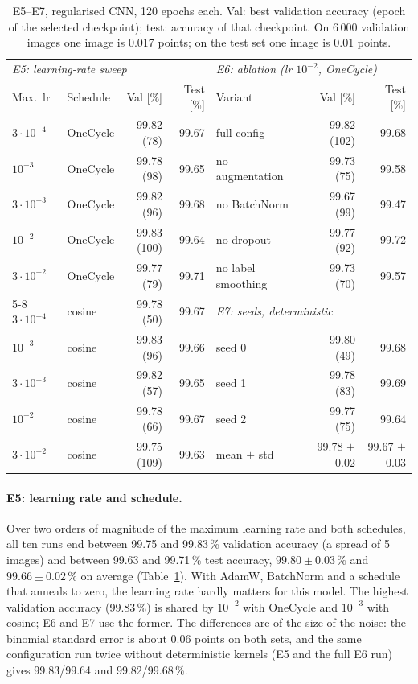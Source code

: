 \documentclass[11pt,a4paper]{article}
\newcommand{\1}{\mathbf{1}}
\begin{document}
\begin{table}[t]
  \centering
  \caption{E5--E7, regularised CNN, 120 epochs each. Val: best validation accuracy (epoch of
    the selected checkpoint); test: accuracy of that checkpoint. On 6\,000 validation images
    one image is 0.017 points; on the test set one image is 0.01 points.}
  \label{tab:cnn}
  \small
  \setlength{\tabcolsep}{4pt}
  \begin{tabular}{llrr@{\hspace{2em}}llrr}
    \toprule
    \multicolumn{4}{l}{\emph{E5: learning-rate sweep}} & \multicolumn{4}{l}{\emph{E6: ablation (lr $10^{-2}$, OneCycle)}} \\
    Max.\ lr & Schedule & Val [\%] & Test [\%] & Variant & & Val [\%] & Test [\%] \\
    \midrule
    $3 \cdot 10^{-4}$ & OneCycle & 99.82 (78) & 99.67 & full config & & 99.82 (102) & 99.68 \\
    $10^{-3}$ & OneCycle & 99.78 (98) & 99.65 & no augmentation & & 99.73 (75) & 99.58 \\
    $3 \cdot 10^{-3}$ & OneCycle & 99.82 (96) & 99.68 & no BatchNorm & & 99.67 (99) & 99.47 \\
    $10^{-2}$ & OneCycle & 99.83 (100) & 99.64 & no dropout & & 99.77 (92) & 99.72 \\
    $3 \cdot 10^{-2}$ & OneCycle & 99.77 (79) & 99.71 & no label smoothing & & 99.73 (70) & 99.57 \\
    \cmidrule(l){5-8}
    $3 \cdot 10^{-4}$ & cosine & 99.78 (50) & 99.67 & \multicolumn{4}{l}{\emph{E7: seeds, deterministic}} \\
    $10^{-3}$ & cosine & 99.83 (96) & 99.66 & seed 0 & & 99.80 (49) & 99.68 \\
    $3 \cdot 10^{-3}$ & cosine & 99.82 (57) & 99.65 & seed 1 & & 99.78 (83) & 99.69 \\
    $10^{-2}$ & cosine & 99.78 (66) & 99.67 & seed 2 & & 99.77 (75) & 99.64 \\
    $3 \cdot 10^{-2}$ & cosine & 99.75 (109) & 99.63 & mean $\pm$ std & & 99.78 $\pm$ 0.02 & 99.67 $\pm$ 0.03 \\
    \bottomrule
  \end{tabular}
\end{table}

\paragraph{E5: learning rate and schedule.} Over two orders of magnitude of the maximum learning
rate and both schedules, all ten runs end between 99.75 and 99.83\,\% validation accuracy (a
spread of 5 images) and between 99.63 and 99.71\,\% test accuracy, $99.80 \pm 0.03\,\%$ and
$99.66 \pm 0.02\,\%$ on average (Table~\ref{tab:cnn}). With AdamW, BatchNorm and a schedule that
anneals to zero, the learning rate hardly matters for this model. The highest validation accuracy
(99.83\,\%) is shared by $10^{-2}$ with OneCycle and $10^{-3}$ with cosine; E6 and E7 use the
former. The differences are of the size of the noise: the binomial standard error is about
0.06 points on both sets, and the same configuration run twice without deterministic kernels
(E5 and the full E6 run) gives 99.83/99.64 and 99.82/99.68\,\%.
\end{document}
